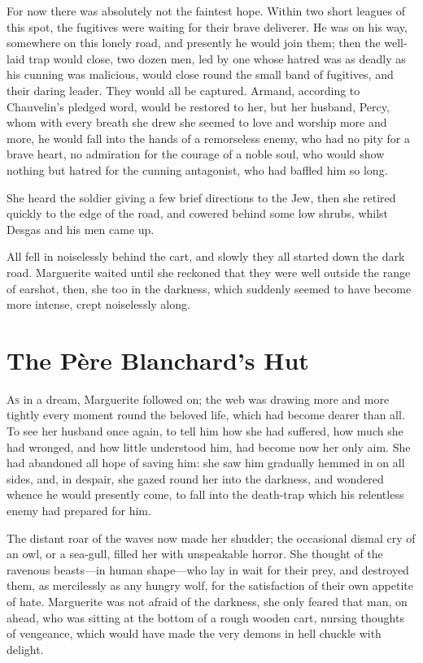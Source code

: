 \documentclass[paper=5.5in:8.5in,BCOR=7mm,twoside,DIV=calc,12pt,usegeometry,chapterprefix,endperiod,headings=big]{scrbook}
\begin{document}
For now there was absolutely not the faintest hope. Within two short leagues of this spot, the fugitives were waiting for their brave deliverer. He was on his way, somewhere on this lonely road, and presently he would join them; then the well-laid trap would close, two dozen men, led by one whose hatred was as deadly as his cunning was malicious, would close round the small band of fugitives, and their daring leader. They would all be captured. Armand, according to Chauvelin's pledged word, would be restored to her, but her husband, Percy, whom with every breath she drew she seemed to love and worship more and more, he would fall into the hands of a remorseless enemy, who had no pity for a brave heart, no admiration for the courage of a noble soul, who would show nothing but hatred for the cunning antagonist, who had baffled him so long.

She heard the soldier giving a few brief directions to the Jew, then she retired quickly to the edge of the road, and cowered behind some low shrubs, whilst Desgas and his men came up.

All fell in noiselessly behind the cart, and slowly they all started down the dark road. Marguerite waited until she reckoned that they were well outside the range of earshot, then, she too in the darkness, which suddenly seemed to have become more intense, crept noiselessly along.

\chapter{The Père Blanchard's Hut}
\lettrine[lines=4]{A}{s} in a dream, Marguerite followed on; the web was drawing more and more tightly every moment round the beloved life, which had become dearer than all. To see her husband once again, to tell him how she had suffered, how much she had wronged, and how little understood him, had become now her only aim. She had abandoned all hope of saving him: she saw him gradually hemmed in on all sides, and, in despair, she gazed round her into the darkness, and wondered whence he would presently come, to fall into the death-trap which his relentless enemy had prepared for him.

The distant roar of the waves now made her shudder; the occasional dismal cry of an owl, or a sea-gull, filled her with unspeakable horror. She thought of the ravenous beasts---in human shape---who lay in wait for their prey, and destroyed them, as mercilessly as any hungry wolf, for the satisfaction of their own appetite of hate. Marguerite was not afraid of the darkness, she only feared that man, on ahead, who was sitting at the bottom of a rough wooden cart, nursing thoughts of vengeance, which would have made the very demons in hell chuckle with delight.
\end{document}
